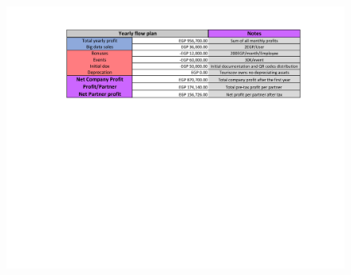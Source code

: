 \documentclass[12pt]{article}
\begin{document}
\begin{figure}
    \begin{center}
        \includegraphics[width=\textwidth]{table2_miniMBA.pdf}
    \end{center}
\end{figure}
\end{document}
